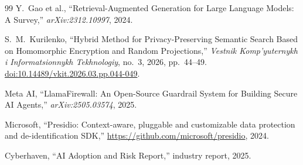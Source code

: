 \documentclass[11pt,a4paper]{article}
\begin{document}
\begin{thebibliography}{99}
 Y.\ Gao et al., ``Retrieval-Augmented
Generation for Large Language Models: A Survey,'' \emph{arXiv:2312.10997},
2024.

 S.\ M.\ Kurilenko, ``Hybrid Method for
Privacy-Preserving Semantic Search Based on Homomorphic Encryption and
Random Projections,'' \emph{Vestnik Komp'yuternykh i Informatsionnykh
Tekhnologiy}, no.\ 3, 2026, pp.\ 44--49.
\href{https://doi.org/10.14489/vkit.2026.03.pp.044-049}{doi:10.14489/vkit.2026.03.pp.044-049}.

 Meta AI, ``LlamaFirewall: An Open-Source
Guardrail System for Building Secure AI Agents,'' \emph{arXiv:2505.03574},
2025.

 Microsoft, ``Presidio: Context-aware, pluggable and
customizable data protection and de-identification SDK,''
\url{https://github.com/microsoft/presidio}, 2024.

 Cyberhaven, ``AI Adoption and Risk Report,''
industry report, 2025.

\end{thebibliography}
\end{document}
